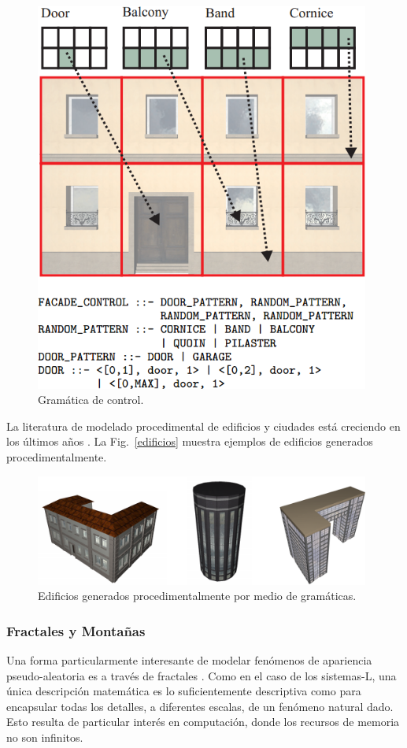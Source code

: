 \begin{figure}
\center
\includegraphics[width=11cm]{figures/controlgrammar}
\caption{Gramática de control.}
\label{fg:controlgrammar}
\end{figure}

La literatura de modelado procedimental de edificios y ciudades está creciendo en los últimos años \cite{Parish2001,Muller2006}.
La Fig.~\ref{edificios} muestra ejemplos de edificios generados procedimentalmente.



\begin{figure}
\center
\includegraphics[width=11cm]{figures/edificios}
\caption{Edificios generados procedimentalmente por medio de gramáticas.}
\label{fg:edificios}
\end{figure}

\subsubsection{Fractales y Montañas}
Una forma particularmente interesante de modelar fenómenos de apariencia pseudo-aleatoria es a través de fractales \cite{Mandelbrot1982}.
Como en el caso de los sistemas-L, una única descripción matemática es lo suficientemente descriptiva como para encapsular todas los detalles, a diferentes escalas, de un fenómeno natural dado.
Esto resulta de particular interés en computación, donde los recursos de memoria no son infinitos.

